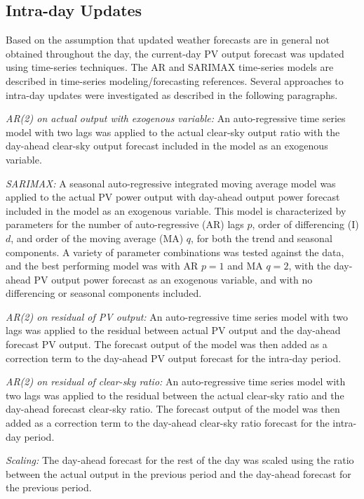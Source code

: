 \subsection{Intra-day Updates}
\label{sec:method-intraday}

Based on the assumption that updated weather forecasts are in general not obtained throughout the day, the current-day PV output forecast was updated using time-series techniques.
The AR and SARIMAX time-series models are described in time-series modeling/forecasting references\cite{box2015time,korstanje2021}.
Several approaches to intra-day updates were investigated as described in the following paragraphs.

\textit{AR(2) on actual output with exogenous variable:}
An auto-regressive time series model with two lags was applied to the actual clear-sky output ratio with the day-ahead clear-sky output forecast included in the model as an exogenous variable.

\textit{SARIMAX:}
A seasonal auto-regressive integrated moving average model was applied to the actual PV power output with day-ahead output power forecast included in the model as an exogenous variable.
This model is characterized by parameters for the number of auto-regressive (AR) lags $p$, order of differencing (I) $d$, and order of the moving average (MA) $q$, for both the trend and seasonal components.
A variety of parameter combinations was tested against the data, and the best performing model was with AR $p=1$ and MA $q=2$, with the day-ahead PV output power forecast as an exogenous variable, and with no differencing or seasonal components included.

\textit{AR(2) on residual of PV output:}
An auto-regressive time series model with two lags was applied to the residual between actual PV output and the day-ahead forecast PV output. The forecast output of the model was then added as a correction term to the day-ahead PV output forecast for the intra-day period.

\textit{AR(2) on residual of clear-sky ratio:}
An auto-regressive time series model with two lags was applied to the residual between the actual clear-sky ratio and the day-ahead forecast clear-sky ratio. The forecast output of the model was then added as a correction term to the day-ahead clear-sky ratio forecast for the intra-day period.

\textit{Scaling:}
The day-ahead forecast for the rest of the day was scaled using the ratio between the actual output in the previous period and the day-ahead forecast for the previous period.

